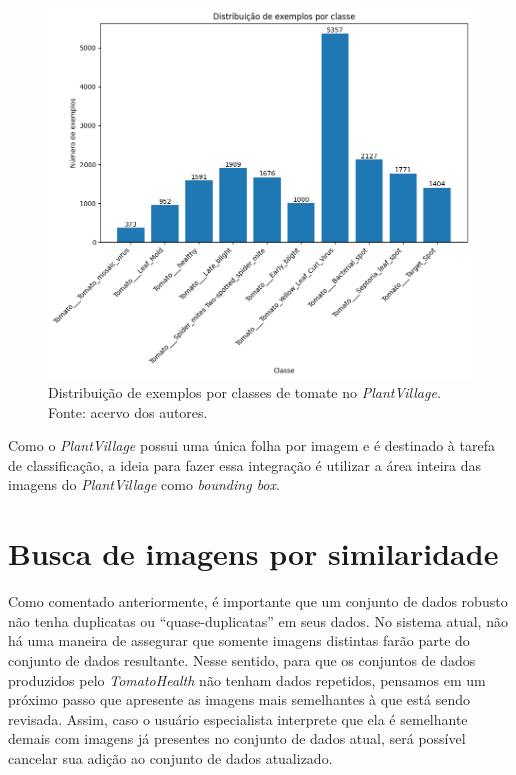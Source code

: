 \begin{figure}[H]
    \centering
    \includegraphics[width=0.9\linewidth]{images/plant_village_distribution.png}
    \caption{\label{fig:distribuicao_plantvillage} Distribuição de exemplos por classes de tomate no \emph{PlantVillage}. Fonte: acervo dos autores.}
\end{figure}

Como o \emph{PlantVillage} possui uma única folha por imagem e é destinado à tarefa de classificação, a ideia para fazer essa integração é utilizar a área inteira das imagens do \emph{PlantVillage} como \emph{bounding box}.

\section{Busca de imagens por similaridade}
Como comentado anteriormente, é importante que um conjunto de dados robusto não tenha duplicatas ou ``quase-duplicatas'' em seus dados. No sistema atual, não há uma maneira de assegurar que somente imagens distintas farão parte do conjunto de dados resultante. Nesse sentido, para que os conjuntos de dados produzidos pelo \emph{TomatoHealth} não tenham dados repetidos, pensamos em um próximo passo que apresente as imagens mais semelhantes à que está sendo revisada. Assim, caso o usuário especialista interprete que ela é semelhante demais com imagens já presentes no conjunto de dados atual, será possível cancelar sua adição ao conjunto de dados atualizado.

